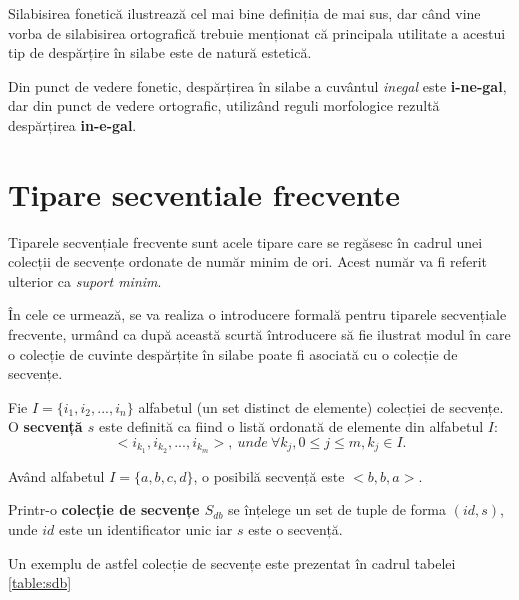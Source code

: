 Silabisirea fonetică ilustrează cel mai bine definiția de mai sus, dar când vine vorba de silabisirea ortografică trebuie menționat că principala utilitate a acestui tip de despărțire în silabe este de natură  estetică.

\begin{ex}
Din punct de vedere fonetic, despărțirea în silabe a cuvântul \textit{inegal} este \textbf{i-ne-gal}, dar din punct de vedere ortografic, utilizând reguli morfologice rezultă despărțirea \textbf{in-e-gal}. 
\end{ex}

\section{Tipare secventiale frecvente}

Tiparele secvențiale frecvente sunt acele tipare care se regăsesc în cadrul unei colecții de secvențe ordonate de număr minim de ori. Acest număr va fi referit ulterior ca \textit{suport minim}. 

În cele ce urmează, se va realiza o introducere formală pentru tiparele secvențiale frecvente, urmând ca după această scurtă întroducere să fie ilustrat modul în care o colecție de cuvinte despărțite în silabe poate fi asociată cu o colecție de secvențe.

\begin{defi}
Fie $I = \{i_1, i_2, ...,i_n\}$ alfabetul (un set distinct de elemente) colecției de secvențe. O \textbf{secvență $s$} este definită ca fiind o listă ordonată de elemente din alfabetul $I$:
\begin{equation}
<i_{k_1},i_{k_2}, ...,i_{k_m}>,\ unde \ \forall k_j, 0 \leq j \leq m, k_j \in I.
\end{equation}
\end{defi}

\begin{ex} 
Având alfabetul $I=\{a,b,c,d\}$, o posibilă secvență este $<b,b,a>$.
\end{ex}

\begin{defi} 
Printr-o \textbf{colecție de secvențe $S_{db}$} se înțelege un set de tuple de forma $(id, s)$, unde $id$ este un identificator unic iar $s$ este o secvență. 
\end{defi}

\begin{ex}
Un exemplu de astfel colecție de secvențe este prezentat în cadrul tabelei \ref{table:sdb}
\end{ex}

